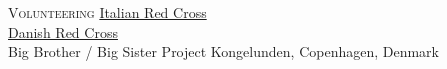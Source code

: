 \begin{paracol}{2}
  \textsc{Volunteering}
\switchcolumn
  \href{https://www.cri.it}{Italian Red Cross}\\
  \href{https://www.rodekors.dk/}{Danish Red Cross}\\
  Big Brother / Big Sister Project Kongelunden, Copenhagen, Denmark
\end{paracol}